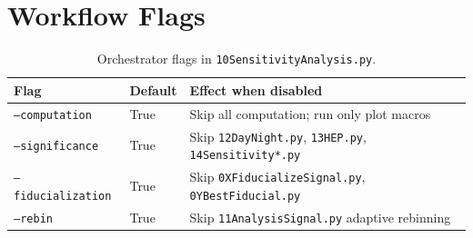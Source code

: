 \documentclass[12pt,a4paper]{article}
\begin{document}
\section{Workflow Flags}
\label{sec:flags}

\begin{table}[ht]
\centering
\caption{Orchestrator flags in \texttt{10SensitivityAnalysis.py}.}
\label{tab:flags}
\begin{tabular}{llp{8cm}}
\toprule
Flag & Default & Effect when disabled \\
\midrule
\texttt{--computation}     & True & Skip all computation; run only plot macros \\
\texttt{--significance}    & True & Skip \texttt{12DayNight.py}, \texttt{13HEP.py}, \texttt{14Sensitivity*.py} \\
\texttt{--fiducialization} & True & Skip \texttt{0XFiducializeSignal.py}, \texttt{0YBestFiducial.py} \\
\texttt{--rebin}           & True & Skip \texttt{11AnalysisSignal.py} adaptive rebinning \\
\bottomrule
\end{tabular}
\end{table}

\end{document}
